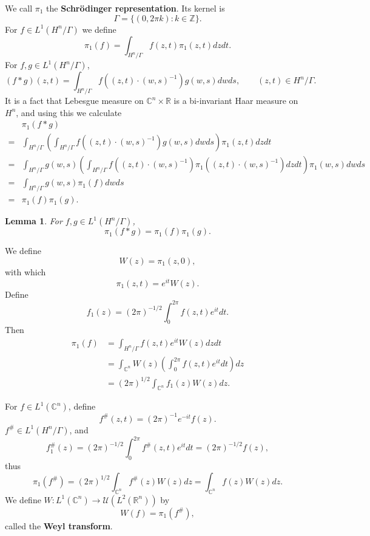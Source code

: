 \documentclass{article}
\newtheorem{lemma}[theorem]{Lemma}
\theoremstyle{definition}
\begin{document}
We call $\pi_1$ the \textbf{Schr\"odinger representation}. Its kernel is
 \[
 \Gamma=\{(0,2\pi k): k \in \mathbb{Z}\}.
 \]
 For $f \in L^1(H^n/\Gamma)$ we define
 \[
 \pi_1(f) = \int_{H^n/\Gamma} f(z,t) \pi_1(z,t) dz dt.
 \]
For $f,g \in L^1(H^n/\Gamma)$,
\[
(f*g)(z,t) = \int_{H^n/\Gamma} f((z,t) \cdot (w,s)^{-1}) g(w,s) dw ds, \qquad (z,t) \in H^n/\Gamma.
\] 
It is a fact that Lebesgue measure on $\mathbb{C}^n \times \mathbb{R}$ is a 
bi-invariant Haar measure on $H^n$, and using this we calculate
\[
\begin{split}
&\pi_1(f*g)\\
=&\int_{H^n/\Gamma} \left(  \int_{H^n/\Gamma} f((z,t) \cdot (w,s)^{-1}) g(w,s) dw ds\right) \pi_1(z,t) dz dt\\
=&\int_{H^n/\Gamma} g(w,s) \left( \int_{H^n/\Gamma}  f((z,t) \cdot (w,s)^{-1}) \pi_1((z,t)\cdot (w,s)^{-1})
  dz dt \right) \pi_1(w,s) dw ds\\
=&\int_{H^n/\Gamma} g(w,s) \pi_1(f) dw ds\\
=&\pi_1(f) \pi_1(g).
\end{split}
\]

\begin{lemma}
For $f,g \in L^1(H^n/\Gamma)$,
\[
\pi_1(f*g) = \pi_1(f) \pi_1(g).
\]
\end{lemma}
 
 We define
 \[
 W(z) = \pi_1(z,0),
 \]
with which
\[
\pi_1(z,t) = e^{it} W(z).
\]
Define
\[
f_1(z) = (2\pi)^{-1/2} \int_0^{2\pi} f(z,t) e^{it} dt.
\]
Then
\begin{align*}
\pi_1(f) &= \int_{H^n/\Gamma} f(z,t) e^{it} W(z) dz dt\\
&=
\int_{\mathbb{C}^n} W(z) \left( \int_0^{2\pi} f(z,t) e^{it} dt \right) dz\\
&=(2\pi)^{1/2} \int_{\mathbb{C}^n}  f_1(z) W(z) dz.
\end{align*}


For $f \in L^1(\mathbb{C}^n)$, define
\[
f^{\#}(z,t) = (2\pi)^{-1} e^{-it} f(z).
\]
$f^{\#} \in  L^1(H^n/\Gamma)$, and
\[
f^{\#}_1(z) = (2\pi)^{-1/2} \int_0^{2\pi} f^{\#}(z,t) e^{it} dt = 
(2\pi)^{-1/2} f(z),
\]
thus
\[
\pi_1(f^{\#}) =(2\pi)^{1/2} \int_{\mathbb{C}^n} f^{\#}(z) W(z) dz
=\int_{\mathbb{C}^n} f(z) W(z) dz.
\]
We define $W:L^1(\mathbb{C}^n) \to \mathscr{U}(L^2(\mathbb{R}^n))$ by
\[
W(f) = \pi_1(f^{\#}),
\]
called the \textbf{Weyl transform}.
\end{document}
